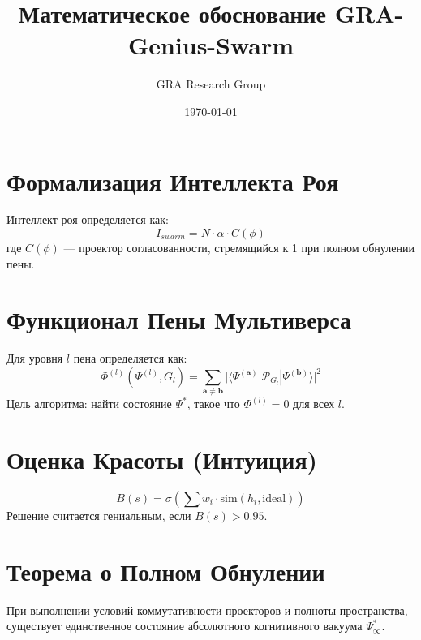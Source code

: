 \documentclass{article}
\title{Математическое обоснование GRA-Genius-Swarm}
\author{GRA Research Group}
\date{\today}
\begin{document}
\maketitle

\section{Формализация Интеллекта Роя}
Интеллект роя определяется как:
\begin{equation}
I_{swarm} = N \cdot \alpha \cdot C(\phi)
\end{equation}
где $C(\phi)$ — проектор согласованности, стремящийся к 1 при полном обнулении пены.

\section{Функционал Пены Мультиверса}
Для уровня $l$ пена определяется как:
\begin{equation}
\Phi^{(l)}(\Psi^{(l)}, G_l) = \sum_{\mathbf{a} \neq \mathbf{b}} \big| \langle \Psi^{(\mathbf{a})} | \mathcal{P}_{G_l} | \Psi^{(\mathbf{b})} \rangle \big|^2
\end{equation}
Цель алгоритма: найти состояние $\Psi^*$, такое что $\Phi^{(l)} = 0$ для всех $l$.

\section{Оценка Красоты (Интуиция)}
\begin{equation}
B(s) = \sigma\left( \sum w_i \cdot \text{sim}(h_i, \text{ideal}) \right)
\end{equation}
Решение считается гениальным, если $B(s) > 0.95$.

\section{Теорема о Полном Обнулении}
При выполнении условий коммутативности проекторов и полноты пространства, существует единственное состояние абсолютного когнитивного вакуума $\Psi_{\infty}^*$.
\end{document}
